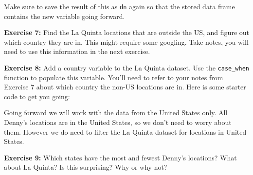 \documentclass[]{book}
\newenvironment{Shaded}{\begin{snugshade}}{\end{snugshade}}
\newcommand{\KeywordTok}[1]{\textcolor[rgb]{0.13,0.29,0.53}{\textbf{#1}}}
\newcommand{\DataTypeTok}[1]{\textcolor[rgb]{0.13,0.29,0.53}{#1}}
\newcommand{\StringTok}[1]{\textcolor[rgb]{0.31,0.60,0.02}{#1}}
\newcommand{\CommentTok}[1]{\textcolor[rgb]{0.56,0.35,0.01}{\textit{#1}}}
\newcommand{\OperatorTok}[1]{\textcolor[rgb]{0.81,0.36,0.00}{\textbf{#1}}}
\newcommand{\NormalTok}[1]{#1}
\theoremstyle{definition}
\theoremstyle{definition}
\theoremstyle{definition}
\theoremstyle{remark}
\begin{document}
Make sure to save the result of this as \texttt{dn} again so that the
stored data frame contains the new variable going forward.

\textbf{Exercise 7:} Find the La Quinta locations that are outside the
US, and figure out which country they are in. This might require some
googling. Take notes, you will need to use this information in the next
exercise.

\textbf{Exercise 8:} Add a country variable to the La Quinta dataset.
Use the \texttt{case\_when} function to populate this variable. You'll
need to refer to your notes from Exercise 7 about which country the
non-US locations are in. Here is some starter code to get you going:

\begin{Shaded}
\end{Shaded}

Going forward we will work with the data from the United States only.
All Denny's locations are in the United States, so we don't need to
worry about them. However we do need to filter the La Quinta dataset for
locations in United States.

\begin{Shaded}
\end{Shaded}

\textbf{Exercise 9:} Which states have the most and fewest Denny's
locations? What about La Quinta? Is this surprising? Why or why not?
\end{document}

